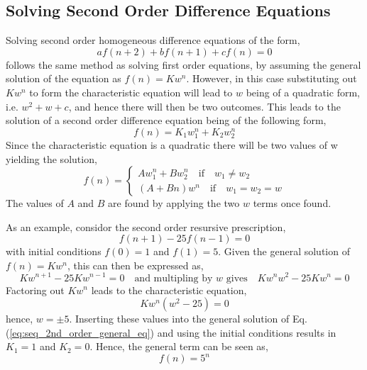     \subsection{Solving Second Order Difference Equations}
        Solving second order homogeneous difference equations of the form,
        \begin{equation}
            af(n+2) + bf(n+1) + cf(n) = 0
            \label{eq:seq_2nd_order_general_eq}
        \end{equation}
        follows the same method as solving first order equations, by assuming the general solution of the equation as 
        \(f(n) = Kw^n\). However, in this case substituting out \(Kw^n\) to form the characteristic equation will lead
        to \(w\) being of a quadratic form, i.e. \(w^2+w+c\), and hence there will then be two outcomes. This leads to 
        the solution of a second order difference equation being of the following form,
        \begin{equation}
            f(n) = K_1 w_1^n + K_2 w_2^n
        \end{equation}
        Since the characteristic equation is a quadratic there will be two values of w yielding the solution,
        \begin{equation}
            f(n) =
            \begin{cases}
                Aw_1^n + Bw_2^n \quad \textrm{if} \quad w_1 \neq w_2 \\
                (A + Bn) w^n \quad \textrm{if} \quad w_1=w_2=w
            \end{cases}
        \end{equation}
        The values of \(A\) and \(B\) are found by applying the two \(w\) terms once found.
        \par \hfill \break
        As an example, considor the second order resursive prescription,
        \begin{equation}
            f(n+1) - 25f(n-1) = 0
        \end{equation}
        with initial conditions \(f(0) = 1\) and \(f(1) = 5\). Given the general solution of \(f(n) = Kw^n\), this can
        then be expressed as,
        \begin{equation}
            Kw^{n+1} - 25Kw^{n-1} = 0 \quad \textrm{and multipling by \(w\) gives} \quad Kw^n w^2 - 25Kw^n = 0
        \end{equation}
        Factoring out \(Kw^n\) leads to the characteristic equation,
        \begin{equation}
            Kw^n(w^2-25) = 0
        \end{equation}
        hence, \(w = \pm 5\). Inserting these values into the general solution of Eq.(\ref{eq:seq_2nd_order_general_eq})
        and using the initial conditions results in \(K_1 = 1\) and \(K_2 = 0\). Hence, the general term can be seen as,
        \begin{equation}
            f(n) = 5^n
        \end{equation}

